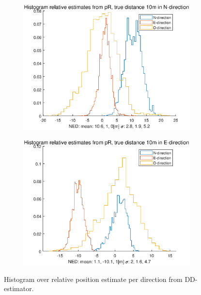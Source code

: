 \begin{figure}[H]
\begin{subfigure}{\textwidth}
\includegraphics[width=\textwidth]{Results/histRel30MinN}
\subcaption{\label{fig:histRel1hN}}
\end{subfigure}
\begin{subfigure}{\textwidth}
\includegraphics[width=\textwidth]{Results/histRel30MinE}
\subcaption{\label{fig:histRel1hE}}
\end{subfigure}
\caption{Histogram over relative position estimate per direction from DD-estimator.}
\end{figure}

